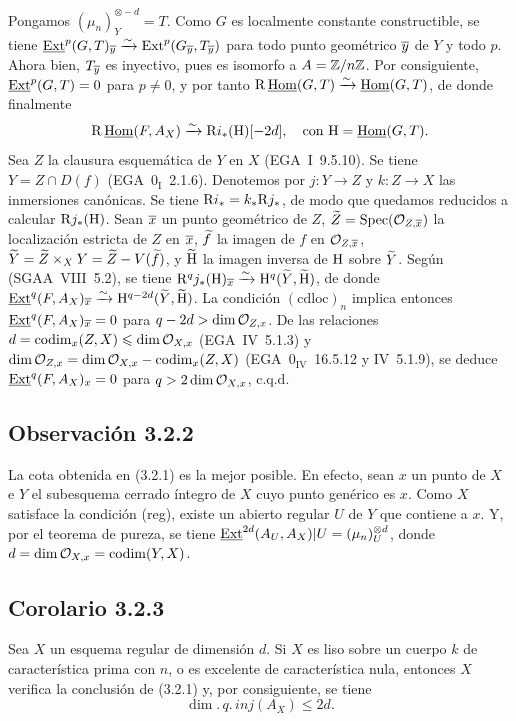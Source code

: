 Pongamos $(\mu_n)^{\otimes -d}_Y = T$. Como $G$ es localmente constante constructible, se tiene $\underline{\operatorname{Ext}}^p(G,T)_{\overline{y}} \xrightarrow{\sim} \operatorname{Ext}^p(G_{\overline{y}}, T_{\overline{y}})$ para todo punto geométrico $\overline{y}$ de $Y$ y todo $p$. Ahora bien, $T_{\overline{y}}$ es inyectivo, pues es isomorfo a $A = \mathbb{Z}/n\mathbb{Z}$. Por consiguiente, $\underline{\operatorname{Ext}}^p(G,T) = 0$ para $p \neq 0$, y por tanto $\mathrm{R}\,\underline{\operatorname{Hom}}(G,T) \xrightarrow{\sim} \underline{\operatorname{Hom}}(G,T)$, de donde finalmente
\[
\mathrm{R}\,\underline{\operatorname{Hom}}(F, A_X) \xrightarrow{\sim} \mathrm{R} i_{*}(\mathrm{H})[-2d], \quad \text{con } \mathrm{H} = \underline{\operatorname{Hom}}(G,T).
\]
Sea $Z$ la clausura esquemática de $Y$ en $X$ (EGA~I~9.5.10). Se tiene $Y = Z \cap D(f)$ (EGA~$0_{\mathrm{I}}$~2.1.6). Denotemos por $j : Y \to Z$ y $k : Z \to X$ las inmersiones canónicas. Se tiene $\mathrm{R} i_{*} = k_{*} \mathrm{R} j_{*}$, de modo que quedamos reducidos a calcular $\mathrm{R} j_{*}(\mathrm{H})$. Sean $\overline{x}$ un punto geométrico de $Z$, $\widetilde{Z} = \operatorname{Spec}(\mathcal{O}_{Z,\overline{x}})$ la localización estricta de $Z$ en $\overline{x}$, $\widetilde{f}$ la imagen de $f$ en $\mathcal{O}_{Z,\overline{x}}$, $\widetilde{Y} = \widetilde{Z} \times_X Y = \widetilde{Z} - V(\widetilde{f})$, y $\widetilde{\mathrm{H}}$ la imagen inversa de $\mathrm{H}$ sobre $\widetilde{Y}$. Según (SGAA~VIII~5.2), se tiene $\mathrm{R}^q j_{*}(\mathrm{H})_{\overline{x}} \xrightarrow{\sim} \mathrm{H}^q(\widetilde{Y}, \widetilde{\mathrm{H}})$, de donde $\underline{\operatorname{Ext}}^q(F, A_X)_{\overline{x}} \xrightarrow{\sim} \mathrm{H}^{q-2d}(\widetilde{Y}, \widetilde{\mathrm{H}})$. La condición $(\mathrm{cdloc})_n$ implica entonces $\underline{\operatorname{Ext}}^q(F, A_X)_{\overline{x}} = 0$ para $q - 2d > \dim \mathcal{O}_{Z,x}$. De las relaciones $d = \operatorname{codim}_{x}(Z,X) \leqslant \dim \mathcal{O}_{X,x}$ (EGA~IV~5.1.3) y $\dim \mathcal{O}_{Z,x} = \dim \mathcal{O}_{X,x} - \operatorname{codim}_{x}(Z,X)$ (EGA~$0_{\mathrm{IV}}$~16.5.12 y IV~5.1.9), se deduce $\underline{\operatorname{Ext}}^q(F, A_X)_x = 0$ para $q > 2\dim \mathcal{O}_{X,x}$, c.q.d.

\subsection*{Observación 3.2.2}
La cota obtenida en (3.2.1) es la mejor posible. En efecto, sean $x$ un punto de $X$ e $Y$ el subesquema cerrado íntegro de $X$ cuyo punto genérico es $x$. Como $X$ satisface la condición (reg), existe un abierto regular $U$ de $Y$ que contiene a $x$. Y, por el teorema de pureza, se tiene $\underline{\operatorname{Ext}}^{2d}(A_U, A_X)|U = (\mu_n)^{\otimes d}_U$, donde $d = \dim \mathcal{O}_{X,x} = \operatorname{codim}(Y,X)$.

\subsection*{Corolario 3.2.3}
Sea $X$ un esquema regular de dimensión $d$. Si $X$ es liso sobre un cuerpo $k$ de característica prima con $n$, o es excelente de característica nula, entonces $X$ verifica la conclusión de (3.2.1) y, por consiguiente, se tiene
\[
\dim.\,q.\,inj(A_X) \leqslant 2d.
\]

